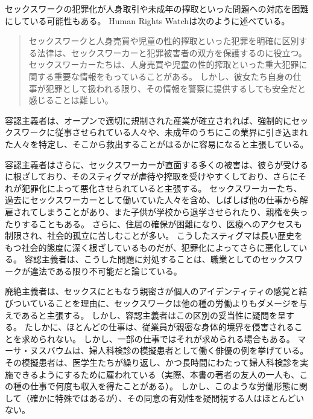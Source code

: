 \documentclass[paper=a4,book,openany]{jlreq} \usepackage{mystyle}
\begin{document}
セックスワークの犯罪化が人身取引や未成年の搾取といった問題への対応を困難にしている可能性もある。
Human Rights Watchは次のように述べている。

\begin{quote}
セックスワークと人身売買や児童の性的搾取といった犯罪を明確に区別する法律は、セックスワーカーと犯罪被害者の双方を保護するのに役立つ。
セックスワーカーたちは、人身売買や児童の性的搾取といった重大犯罪に関する重要な情報をもっていることがある。
しかし、彼女たち自身の仕事が犯罪として扱われる限り、その情報を警察に提供するしても安全だと感じることは難しい。
\citep{watch19:_why_sex_work_shoul_be_decrim}
\end{quote}

容認主義者は、オープンで適切に規制された産業が確立されれば、強制的にセックスワークに従事させられている人々や、未成年のうちにこの業界に引き込まれた人々を特定し、そこから救出することがはるかに容易になると主張している\citep{albright17:_decreas_human_traff_sex_work_decrim}。

容認主義者はさらに、セックスワーカーが直面する多くの被害は、彼らが受けるに根ざしており、そのスティグマが虐待や搾取を受けやすくしており、さらにそれが犯罪化によって悪化させられていると主張する。
セックスワーカーたち、過去にセックスワーカーとして働いていた人々を含め、しばしば他の仕事から解雇されてしまうことがあり、また子供が学校から退学させられたり、親権を失ったりすることもある。
さらに、住居の確保が困難になり、医療へのアクセスも制限され、社会的孤立に苦しむことが多い\citep{stardust17:_stigm_sex_work_comes_high_cost}。
こうしたスティグマは長い歴史をもつ社会的態度に深く根ざしているものだが、犯罪化によってさらに悪化している。
容認主義者は、こうした問題に対処することは、職業としてのセックスワークが違法である限り不可能だと論じている。

廃絶主義者は、セックスにともなう親密さが個人のアイデンティティの感覚と結びついていることを理由に、セックスワークは他の種の労働よりもダメージを与えであると主張する。
しかし、容認主義者はこの区別の妥当性に疑問を呈する。
たしかに、ほとんどの仕事は、従業員が親密な身体的境界を侵害されることを求められない。
しかし、一部の仕事ではそれが求められる場合もある。
マーサ・ヌスバウムは、婦人科検診の模擬患者として働く俳優の例を挙げている\citep{nussbaum98:_wheth_reason_prejud}。
その模擬患者は、医学生たちが繰り返し、かつ長時間にわたって婦人科検診を実施できるようにするために雇われている（実際、本書の著者の友人の一人も、この種の仕事で何度も収入を得たことがある）。
しかし、このような労働形態に関して（確かに特殊ではあるが）、その同意の有効性を疑問視する人はほとんどいない。
\end{document}
